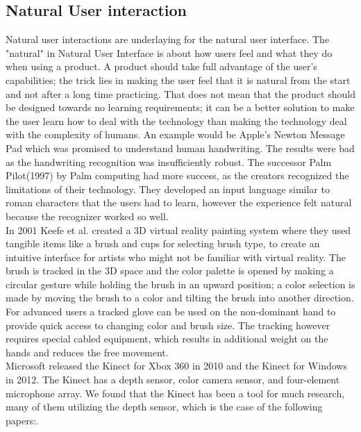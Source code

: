 \subsection{Natural User interaction}
Natural user interactions are underlaying for the natural user interface. The "natural" in Natural User Interface is about how users feel and what they do when using a product. A product should take full advantage of the user's capabilities; the trick lies in making the user feel that it is natural from the start and not after a long time practicing. That does not mean that the product should be designed towards no learning requirements; it can be a better solution to make the user learn how to deal with the technology than making the technology deal with the complexity of humans. An example would be Apple's Newton Message Pad which was promised to understand human handwriting. The results were bad as the handwriting recognition was insufficiently robust. The successor Palm Pilot(1997) by Palm computing had more success, as the creators recognized the limitations of their technology. They developed an input language similar to roman characters that the users had to learn, however the experience felt natural because the recognizer worked so well.\cite{Wigdor:2011}\\ 


In 2001 Keefe et al. \cite{Keefe:2001} created a 3D virtual reality painting system where they used tangible items like a brush and cups for selecting brush type, to create an intuitive interface for artists who might not be familiar with virtual reality. The brush is tracked in the 3D space and the color palette is opened by making a circular gesture while holding the brush in an upward position; a color selection is made by moving the brush to a color and tilting the brush into another direction.
For advanced users a tracked glove can be used on the non-dominant hand to provide quick access to changing color and brush size.
The tracking however requires special cabled equipment, which results in additional weight on the hands and reduces the free movement. \\

Microsoft released the Kinect for Xbox 360 in 2010\cite{KinectFiction:2010} and the Kinect for Windows in 2012\cite{KinnectPower:2012}. The Kinect has a depth sensor, color camera sensor, and four-element microphone array. We found that the Kinect has been a tool for much research, many of them utilizing the depth sensor, which is the case of the following papers:\cite{Wilson:2010, Aigner:2012, Walter:2014}.\\

